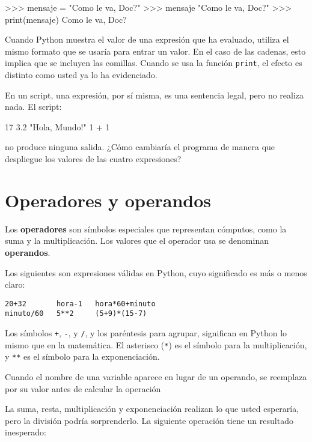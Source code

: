 \beforeverb
\begin{pyconcode}
>>> mensaje = "Como le va, Doc?"
>>> mensaje
"Como le va, Doc?"
>>> print(mensaje)
Como le va, Doc?
\end{pyconcode}
\afterverb
%

Cuando  Python  muestra el valor de una expresión que
ha evaluado, utiliza el mismo formato que se usaría para entrar un valor. 
En el caso de las cadenas, esto implica que se incluyen las
comillas. Cuando se usa la función \texttt{print}, el efecto es distinto 
como usted ya lo ha evidenciado.

En un script, una expresión, por sí misma, es una sentencia legal, pero no 
realiza nada. El script:

\beforeverb
\begin{pythoncode}
17
3.2
"Hola, Mundo!"
1 + 1
\end{pythoncode}
\afterverb
%

no produce ninguna salida. ¿Cómo cambiaría el programa 
de manera que despliegue los valores de las cuatro expresiones?

\section{Operadores y operandos}

Los {\bf operadores} son símbolos especiales que representan cómputos,
como la suma y la multiplicación. Los valores que el operador usa se denominan
{\bf operandos}.

Los siguientes son expresiones válidas en Python, cuyo significado es más o
menos claro:
\beforeverb
\begin{verbatim}
20+32       hora-1   hora*60+minuto   
minuto/60   5**2     (5+9)*(15-7)
\end{verbatim}
\afterverb
%

Los  símbolos \texttt{+}, \texttt{-}, y \texttt{/}, y los paréntesis para
agrupar, significan en Python lo mismo que en la matemática.
El asterisco (\texttt{*}) es el símbolo para la multiplicación, y \texttt{**}
es el  símbolo para la exponenciación.

Cuando el nombre de una variable aparece en lugar de un operando, se
reemplaza por su valor antes de calcular la operación

La suma, resta, multiplicación y exponenciación realizan lo que usted
esperaría, pero la división podría sorprenderlo.  La siguiente
operación tiene un resultado inesperado:

